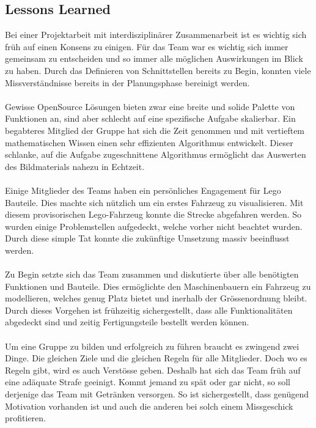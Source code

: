 \subsection{Lessons Learned}

Bei einer Projektarbeit mit interdisziplinärer Zusammenarbeit ist es wichtig sich früh auf einen Konsens zu einigen.
Für das Team war es wichtig sich immer gemeinsam zu entscheiden und so immer alle möglichen Auswirkungen im Blick zu haben.
Durch das Definieren von Schnittstellen bereits zu Begin, konnten viele Missverständnisse bereits in der Planungsphase bereinigt werden.
\\
\\
Gewisse OpenSource Lösungen bieten zwar eine breite und solide Palette von Funktionen an, sind aber schlecht auf eine spezifische Aufgabe skalierbar.
Ein begabteres Mitglied der Gruppe hat sich die Zeit genommen und mit vertieftem mathematischen Wissen einen sehr effizienten Algorithmus entwickelt.
Dieser schlanke, auf die Aufgabe zugeschnittene Algorithmus ermöglicht das Auswerten des Bildmaterials nahezu in Echtzeit.
\\
\\
Einige Mitglieder des Teams haben ein persönliches Engagement für Lego Bauteile. Dies machte sich nützlich um ein erstes Fahrzeug zu visualisieren.
Mit diesem provisorischen Lego-Fahrzeug konnte die Strecke abgefahren werden. So wurden einige Problemstellen aufgedeckt, welche vorher nicht beachtet wurden. Durch diese simple Tat konnte die zukünftige Umsetzung massiv beeinflusst werden.
\\
\\
Zu Begin setzte sich das Team zusammen und diskutierte über alle benötigten Funktionen und Bauteile.
Dies ermöglichte den Maschinenbauern ein Fahrzeug zu modellieren, welches genug Platz bietet und inerhalb der Grössenordnung bleibt.
Durch dieses Vorgehen ist frühzeitig sichergestellt, dass alle Funktionalitäten abgedeckt sind und zeitig Fertigungsteile bestellt werden können.
\\
\\
Um eine Gruppe zu bilden und erfolgreich zu führen braucht es zwingend zwei Dinge.
Die gleichen Ziele und die gleichen Regeln für alle Mitglieder.
Doch wo es Regeln gibt, wird es auch Verstösse geben. Deshalb hat sich das Team früh auf eine adäquate Strafe geeinigt.
Kommt jemand zu spät oder gar nicht, so soll derjenige das Team mit Getränken versorgen.
So ist sichergestellt, dass genügend Motivation vorhanden ist und auch die anderen bei solch einem Missgeschick profitieren.